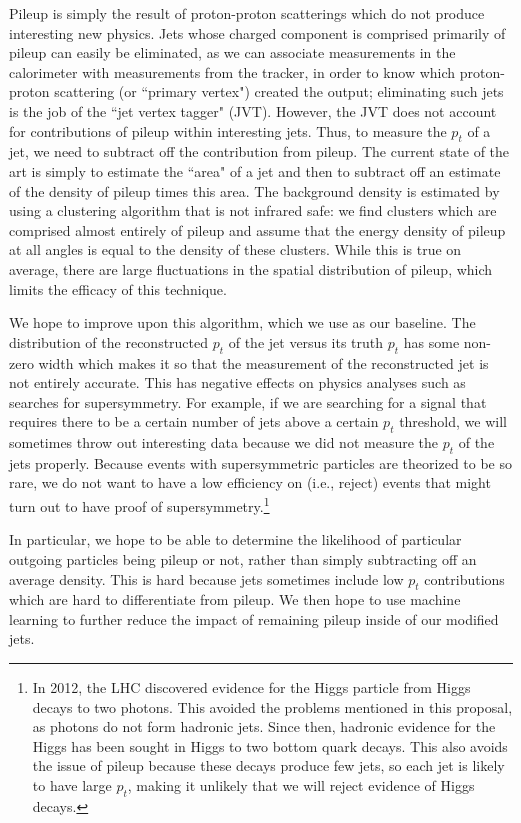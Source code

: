 \documentclass[12pt]{article}
\numberwithin{equation}{section}
\theoremstyle{definition}
\begin{document}
Pileup is simply the result of proton-proton scatterings which do not produce interesting new physics. Jets whose charged component is comprised primarily of pileup can easily be eliminated, as we can associate measurements in the calorimeter with measurements from the tracker, in order to know which proton-proton scattering (or ``primary vertex") created the output; eliminating such jets is the job of the ``jet vertex tagger" (JVT)\cite{ref:atlasPileup}. However, the JVT does not account for contributions of pileup within interesting jets. Thus, to measure the $p_t$ of a jet, we need to subtract off the contribution from pileup. The current state of the art is simply to estimate the ``area" of a jet\cite{ref:cacciari2} and then to subtract off an estimate of the density of pileup times this area\cite{ref:cacciari3}. The background density is estimated by using a clustering algorithm that is not infrared safe: we find clusters which are comprised almost entirely of pileup and assume that the energy density of pileup at all angles is equal to the density of these clusters. While this is true on average, there are large fluctuations in the spatial distribution of pileup, which limits the efficacy of this technique.

We hope to improve upon this algorithm, which we use as our baseline. The distribution of the reconstructed $p_t$ of the jet versus its truth $p_t$ has some non-zero width which makes it so that the measurement of the reconstructed jet is not entirely accurate. This has negative effects on physics analyses such as searches for supersymmetry. For example, if we are searching for a signal that requires there to be a certain number of jets above a certain $p_t$ threshold, we will sometimes throw out interesting data because we did not measure the $p_t$ of the jets properly. Because events with supersymmetric particles are theorized to be so rare, we do not want to have a low efficiency on (i.e., reject) events that might turn out to have proof of supersymmetry.\footnote{In 2012, the LHC discovered evidence for the Higgs particle from Higgs decays to two photons. This avoided the problems mentioned in this proposal, as photons do not form hadronic jets. Since then, hadronic evidence for the Higgs has been sought in Higgs to two bottom quark decays. This also avoids the issue of pileup because these decays produce few jets, so each jet is likely to have large $p_t$, making it unlikely that we will reject evidence of Higgs decays.}

In particular, we hope to be able to determine the likelihood of particular outgoing particles being pileup or not, rather than simply subtracting off an average density. This is hard because jets sometimes include low $p_t$ contributions which are hard to differentiate from pileup. We then hope to use machine learning to further reduce the impact of remaining pileup inside of our modified jets.
\end{document}
